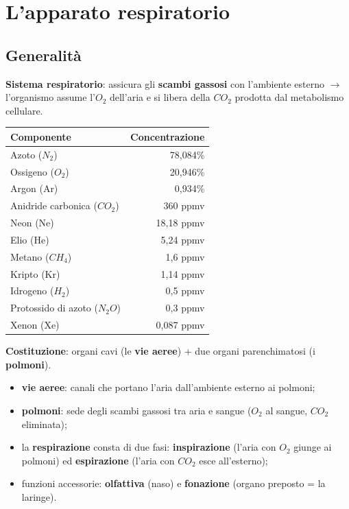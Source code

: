 \chapter{L'apparato respiratorio}

\section{Generalità}

\textbf{Sistema respiratorio}: assicura gli \textbf{scambi gassosi} con l'ambiente esterno
$\rightarrow$ l'organismo assume l'$O_2$ dell'aria e si libera della $CO_2$ prodotta dal metabolismo
cellulare.

\begin{table}[htbp]
  \centering \small \renewcommand{\arraystretch}{1.15}
  \begin{tabular}{|l|r|}
    \hline
    \textbf{Componente} & \textbf{Concentrazione} \\
    \hline
    Azoto ($N_2$)              & 78,084\% \\
    Ossigeno ($O_2$)          & 20,946\% \\
    Argon (Ar)                & 0,934\% \\
    Anidride carbonica ($CO_2$) & 360 ppmv \\
    Neon (Ne)                 & 18,18 ppmv \\
    Elio (He)                 & 5,24 ppmv \\
    Metano ($CH_4$)           & 1,6 ppmv \\
    Kripto (Kr)               & 1,14 ppmv \\
    Idrogeno ($H_2$)          & 0,5 ppmv \\
    Protossido di azoto ($N_2O$) & 0,3 ppmv \\
    Xenon (Xe)                & 0,087 ppmv \\
    \hline
  \end{tabular}
\end{table}

\textbf{Costituzione}: organi cavi (le \textbf{vie aeree}) + due organi parenchimatosi (i
\textbf{polmoni}).
\begin{itemize}
  \item \textbf{vie aeree}: canali che portano l'aria dall'ambiente esterno ai polmoni;
  \item \textbf{polmoni}: sede degli scambi gassosi tra aria e sangue ($O_2$ al sangue, $CO_2$
    eliminata);
  \item la \textbf{respirazione} consta di due fasi: \textbf{inspirazione} (l'aria con $O_2$ giunge
    ai polmoni) ed \textbf{espirazione} (l'aria con $CO_2$ esce all'esterno);
  \item funzioni accessorie: \textbf{olfattiva} (naso) e \textbf{fonazione} (organo preposto = la
    laringe).
\end{itemize}

